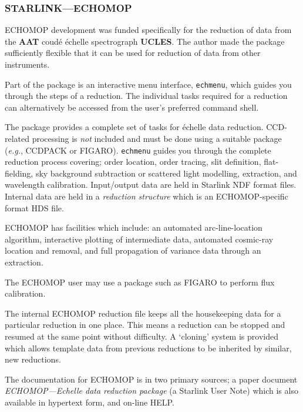 \documentclass[twoside,11pt]{article}
\newcommand{\htmlref}[2]{#1}
\newcommand{\xref}[3]{#1}
\newcommand{\xlabel}[1]{}
\newcommand{\sgspec}[2]{#1}
\newcommand{\sgspec}[2]{#2}
\begin{document}
\subsubsection{\xlabel{echomop}\label{se_echomop}STARLINK\sgspec{---}{ - }ECHOMOP}

ECHOMOP development was funded specifically for the reduction of data from
the \htmlref{{\bf AAT}}{gl_aao_aat} coud\'{e} \'{e}chelle spectrograph
\htmlref{{\bf UCLES}}{gl_ucles}\@.
The author made the package sufficiently flexible that it can be used for
reduction of data from other instruments.

Part of the package is an interactive menu interface, {\tt echmenu}, which
guides you through the steps of a reduction.  The individual tasks
required for a reduction can alternatively be accessed from the user's
preferred command shell.

The package provides a complete set of tasks for \'{e}chelle data
reduction.  CCD-related processing is {\em not} included and must be done
using a suitable package ({\em{e.g.}}, \xref{CCDPACK}{sun139}{} or
\xref{FIGARO}{sun86}{})\@.  {\tt echmenu} guides you
through the complete reduction process covering; order location,
order tracing, slit definition, flat-fielding, sky background subtraction or
scattered light modelling, extraction, and wavelength calibration.
Input/output data are held in \xref{Starlink NDF format}{sun33}{} files.
Internal data are held in a {\em reduction structure} which is an
ECHOMOP-specific format HDS file.

ECHOMOP has facilities which include: an automated arc-line-location
algorithm, interactive plotting of intermediate data, automated cosmic-ray
location and removal, and full propagation of variance data through an
extraction.

The ECHOMOP user may use a package such as FIGARO to perform flux
calibration.

The internal ECHOMOP reduction file keeps all the housekeeping data for a
particular reduction in one place.  This means a reduction can be stopped
and resumed at the same point without difficulty.  A `cloning' system is
provided which allows template data from previous reductions to be
inherited by similar, new reductions.

The documentation for ECHOMOP is in two primary sources; a paper
document \xref{{\sl ECHOMOP\sgspec{---}{ - }Echelle data reduction package}}
{sun152}{}
(a Starlink User Note) which is also available in hypertext form,
and on-line HELP\@.
\end{document}

